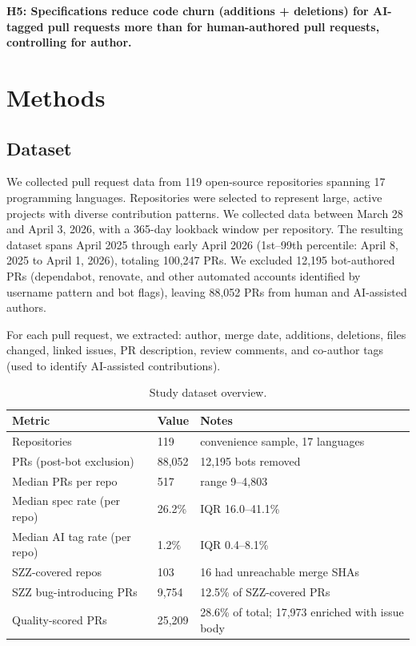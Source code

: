 \documentclass[a4paper,UKenglish,cleveref,autoref,thm-restate]{lipics-v2021}
\begin{document}
\noindent
\textbf{H5: Specifications reduce code churn (additions + deletions) for AI-tagged pull requests more than for human-authored pull requests, controlling for author.}

\section{Methods}

\subsection{Dataset}

We collected pull request data from 119 open-source repositories spanning 17 programming languages. Repositories were selected to represent large, active projects with diverse contribution patterns. We collected data between March 28 and April 3, 2026, with a 365-day lookback window per repository. The resulting dataset spans April 2025 through early April 2026 (1st--99th percentile: April 8, 2025 to April 1, 2026), totaling 100,247 PRs. We excluded 12,195 bot-authored PRs (dependabot, renovate, and other automated accounts identified by username pattern and bot flags), leaving 88,052 PRs from human and AI-assisted authors.

For each pull request, we extracted: author, merge date, additions, deletions, files changed, linked issues, PR description, review comments, and co-author tags (used to identify AI-assisted contributions).

\begin{table}[t]
\centering
\caption{Study dataset overview.}
\label{tab:dataset-overview}
\begin{tabular}{@{}llp{4.5cm}@{}}
\toprule
\textbf{Metric} & \textbf{Value} & \textbf{Notes} \\
\midrule
Repositories & 119 & convenience sample, 17 languages \\
PRs (post-bot exclusion) & 88,052 & 12,195 bots removed \\
Median PRs per repo & 517 & range 9--4,803 \\
Median spec rate (per repo) & 26.2\% & IQR 16.0--41.1\% \\
Median AI tag rate (per repo) & 1.2\% & IQR 0.4--8.1\% \\
SZZ-covered repos & 103 & 16 had unreachable merge SHAs \\
SZZ bug-introducing PRs & 9,754 & 12.5\% of SZZ-covered PRs \\
Quality-scored PRs & 25,209 & 28.6\% of total; 17,973 enriched with issue body \\
\bottomrule
\end{tabular}
\end{table}
\end{document}
